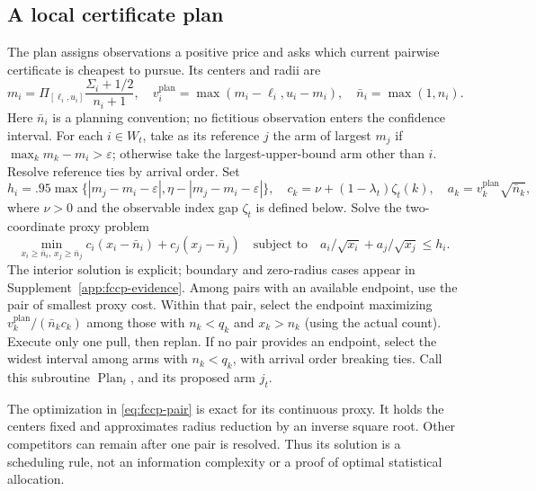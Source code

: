 \documentclass[11pt]{article}
\theoremstyle{remark}
\begin{document}
\subsection{A local certificate plan}\label{sec:fccp-plan}
The plan assigns observations a positive price and asks which current
pairwise certificate is cheapest to pursue. Its centers and radii are
\begin{equation}\label{eq:fccp-planning}
 m_i=\Pi_{[\ell_i,u_i]}\frac{\Sigma_i+1/2}{n_i+1},\quad
 v_i^{\mathrm{plan}}=\max(m_i-\ell_i,u_i-m_i),\quad
 \bar n_i=\max(1,n_i).
\end{equation}
Here $\bar n_i$ is a planning convention; no fictitious observation enters
the confidence interval. For each $i\in W_t$, take as its reference $j$
the arm of largest $m_j$ if $\max_km_k-m_i>\varepsilon$; otherwise take
the largest-upper-bound arm other than $i$. Resolve reference ties by arrival
order. Set
\begin{equation}\label{eq:fccp-price}
 h_i=.95\max\{|m_j-m_i-\varepsilon|,
                   \eta-|m_j-m_i-\varepsilon|\},\quad
 c_k=\nu+(1-\lambda_t)\zeta_t(k),\quad
 a_k=v_k^{\mathrm{plan}}\sqrt{\bar n_k},
\end{equation}
where $\nu>0$ and the observable index gap $\zeta_t$ is defined below.
Solve the two-coordinate proxy problem
\begin{equation}\label{eq:fccp-pair}
 \min_{x_i\ge\bar n_i,\,x_j\ge\bar n_j}
  c_i(x_i-\bar n_i)+c_j(x_j-\bar n_j)
 \quad\text{subject to}\quad
  a_i/\sqrt{x_i}+a_j/\sqrt{x_j}\le h_i.
\end{equation}
The interior solution is explicit; boundary and zero-radius cases appear
in Supplement~\ref{app:fccp-evidence}. Among pairs with an available
endpoint, use the pair of smallest proxy cost. Within that pair, select
the endpoint maximizing $v_k^{\mathrm{plan}}/(\bar n_kc_k)$ among those
with $n_k<q_k$ and $x_k>n_k$ (using the actual count). Execute only one pull,
then replan. If no pair provides an endpoint, select the widest interval
among arms with $n_k<q_k$, with arrival order breaking ties. Call this
subroutine $\operatorname{Plan}_t$, and its proposed arm $j_t$.

The optimization in \eqref{eq:fccp-pair} is exact for its continuous
proxy. It holds the centers fixed and approximates radius reduction by
an inverse square root. Other competitors can remain after one pair is
resolved. Thus its solution is a scheduling rule, not an information
complexity or a proof of optimal statistical allocation.
\end{document}
